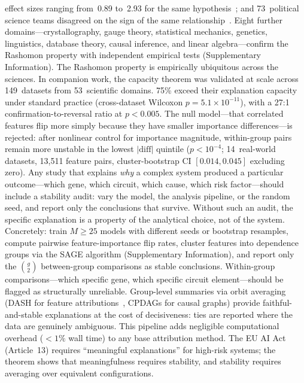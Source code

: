 \documentclass[11pt]{article}
\begin{document}
effect sizes ranging from~0.89 to~2.93 for the same
hypothesis~\citep{silberzahn2018many}; and 73~political science teams
disagreed on the sign of the same
relationship~\citep{breznau2022observing}.  Eight further domains---crystallography,
gauge theory, statistical mechanics, genetics, linguistics, database
theory, causal inference, and linear algebra---confirm the Rashomon
property with independent empirical tests (Supplementary Information).
The Rashomon property is empirically ubiquitous across the sciences.
In companion work, the capacity theorem was validated at scale across
149~datasets from 53~scientific domains.  75\% exceed their explanation
capacity under standard practice (cross-dataset Wilcoxon
$p = 5.1 \times 10^{-11}$), with a 27:1 confirmation-to-reversal ratio
at $p < 0.005$.  The null model---that correlated features flip more
simply because they have smaller importance differences---is rejected:
after nonlinear control for importance magnitude, within-group pairs
remain more unstable in the lowest $|\text{diff}|$ quintile
($p < 10^{-4}$; 14~real-world datasets, 13{,}511 feature pairs,
cluster-bootstrap CI $[0.014, 0.045]$ excluding zero).
Any study that explains \emph{why} a complex system produced a
particular outcome---which gene, which circuit, which cause, which
risk factor---should include a stability audit: vary the model, the
analysis pipeline, or the random seed, and report only the conclusions
that survive.  Without such an audit, the specific explanation is a
property of the analytical choice, not of the system.
Concretely: train $M \geq 25$ models with different seeds or bootstrap
resamples, compute pairwise feature-importance flip rates, cluster
features into dependence groups via the SAGE algorithm (Supplementary
Information), and report only the $\binom{g}{2}$ between-group
comparisons as stable conclusions.  Within-group comparisons---which
specific gene, which specific circuit element---should be flagged as
structurally unreliable.  Group-level summaries via orbit averaging
(DASH for feature attributions~\citep{caraker2026dash}, CPDAGs for causal graphs) provide
faithful-and-stable explanations at the cost of decisiveness:
ties are reported where the data are genuinely ambiguous.  This
pipeline adds negligible computational overhead ($< 1\%$ wall time)
to any base attribution method.
The EU AI
Act (Article~13) requires ``meaningful explanations'' for high-risk
systems; the theorem shows that meaningfulness requires stability, and
stability requires averaging over equivalent configurations.
\end{document}
